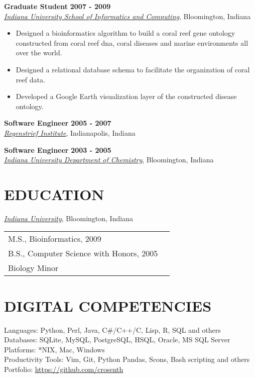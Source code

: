 \documentclass{res}
\begin{document}
\begin{resume}
\textbf{Graduate Student} \hfill \textbf{2007 - 2009}\\
\href{http://www.informatics.indiana.edu/}{\textit{Indiana University School of Informatics and Computing}}, Bloomington, Indiana
\begin{itemize} \itemsep -2pt
\item Designed a bioinformatics algorithm to build a coral reef gene ontology constructed from coral reef dna, coral diseases and marine environments all over the world.
\item Designed a relational database schema to facilitate the organization of coral reef data.
\item Developed a Google Earth visualization layer of the constructed disease ontology.
\end{itemize}

\textbf{Software Engineer} \hfill \textbf{2005 - 2007}\\
\href{http://www.regenstrief.org/}{\textit{Regenstrief Institute}}, Indianapolis, Indiana

\textbf{Software Engineer} \hfill \textbf{2003 - 2005}\\
\href{http://chem.indiana.edu/}{\textit{Indiana University Department of Chemistry}}, Bloomington, Indiana

\section{EDUCATION}
\href{http://www.iub.edu/}{\textit{Indiana University}}, Bloomington, Indiana\\
\begin{tabular}{p{10cm} l} 
M.S., Bioinformatics, 2009\\
B.S., Computer Science with Honors, 2005\\
Biology Minor
\end{tabular}

\section{DIGITAL COMPETENCIES} 
Languages: Python, Perl, Java, C\#/C++/C, Lisp, R, SQL and others\\
Databases: SQLite, MySQL, PostgreSQL, HSQL, Oracle, MS SQL Server\\
Platforms: *NIX, Mac, Windows\\
Productivity Tools: Vim, Git, Python Pandas, Scons, Bash scripting and others\\
Portfolio: \url{https://github.com/crosenth}


\end{resume}
\end{document}
